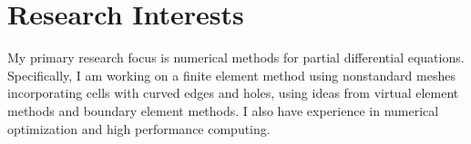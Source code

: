 \section{Research Interests}

My primary research focus is numerical methods for partial differential equations.
Specifically, I am working on a finite element method using nonstandard meshes incorporating cells with curved edges and holes, using ideas from virtual element methods and boundary element methods.
I also have experience in numerical optimization and high performance computing.